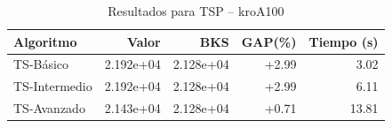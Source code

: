 \begin{table}[h]
\centering
\caption{Resultados para TSP -- kroA100}
\label{tab:tsp_kroA100}
\begin{tabular}{lrrrr}
\hline
\textbf{Algoritmo} & \textbf{Valor} & \textbf{BKS} & \textbf{GAP(\%)} & \textbf{Tiempo (s)} \\
\hline
TS-Básico & 2.192e+04 & 2.128e+04 & +2.99 & 3.02 \\
TS-Intermedio & 2.192e+04 & 2.128e+04 & +2.99 & 6.11 \\
TS-Avanzado & 2.143e+04 & 2.128e+04 & +0.71 & 13.81 \\
\hline
\end{tabular}
\end{table}
